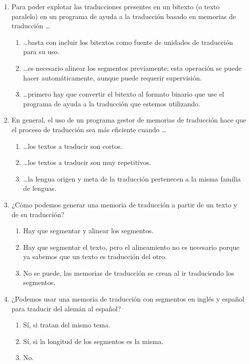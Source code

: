 \begin{enumerate}
\item Para poder explotar las traducciones presentes en un bitexto (o texto paralelo) en un programa de ayuda a la traducción basado en memorias de traducción \ldots \begin{enumerate} \item \ldots basta con incluir los bitextos como fuente de unidades de traducción para su uso. \item \ldots es necesario alinear los segmentos previamente; esta operación se puede hacer automáticamente, aunque puede requerir supervisión. \item \ldots primero hay que convertir el bitexto al formato binario que use el programa de ayuda a la traducción que estemos utilizando. \end{enumerate} 

\item En general, el uso de un programa gestor de memorias de traducción hace que el proceso de traducción sea más eficiente cuando \ldots\begin{enumerate} \item \ldots los textos a traducir son cortos. \item \ldots los textos a traducir son muy repetitivos. \item \ldots la lengua origen y meta de la traducción pertenecen a la misma familia de lenguas. \end{enumerate} 

\item ¿Cómo podemos generar una memoria de traducción a partir de un texto y de su traducción? \begin{enumerate} \item Hay que segmentar y alinear los segmentos. \item Hay que segmentar el texto, pero el alineamiento no es necesario porque ya sabemos que un texto es traducción del otro. \item No se puede, las memorias de traducción se crean al ir traduciendo los segmentos. \end{enumerate} 

\item ¿Podemos usar una memoria de traducción con segmentos en inglés y español para traducir del alemán al español? \begin{enumerate} \item Sí, si tratan del mismo tema. \item Sí, si la longitud de los segmentos es la misma. \item No. \end{enumerate} \end{enumerate} 

